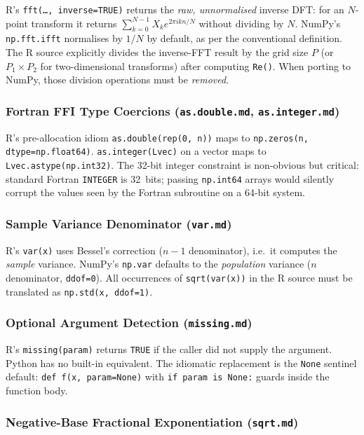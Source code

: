 \documentclass[12pt,a4paper]{article}
\begin{document}
R's \texttt{fft(\ldots,\,inverse=TRUE)} returns the \emph{raw, unnormalised} inverse DFT: for an $N$-point transform it returns $\sum_{k=0}^{N-1} X_k e^{2\pi i k n /N}$ without dividing by $N$. NumPy's \texttt{np.fft.ifft} normalises by $1/N$ by default, as per the conventional definition. The R source explicitly divides the inverse-FFT result by the grid size $P$ (or $P_1 \times P_2$ for two-dimensional transforms) after computing \texttt{Re()}. When porting to NumPy, those division operations must be \emph{removed}.

\subsubsection{Fortran FFI Type Coercions (\texttt{as.double.md}, \texttt{as.integer.md})}

R's pre-allocation idiom \texttt{as.double(rep(0, n))} maps to \texttt{np.zeros(n, dtype=np.float64)}. \texttt{as.integer(Lvec)} on a vector maps to \texttt{Lvec.astype(np.int32)}. The 32-bit integer constraint is non-obvious but critical: standard Fortran \texttt{INTEGER} is 32~bits; passing \texttt{np.int64} arrays would silently corrupt the values seen by the Fortran subroutine on a 64-bit system.

\subsubsection{Sample Variance Denominator (\texttt{var.md})}

R's \texttt{var(x)} uses Bessel's correction ($n-1$ denominator), i.e.\ it computes the \emph{sample} variance. NumPy's \texttt{np.var} defaults to the \emph{population} variance ($n$ denominator, \texttt{ddof=0}). All occurrences of \texttt{sqrt(var(x))} in the R source must be translated as \texttt{np.std(x, ddof=1)}.

\subsubsection{Optional Argument Detection (\texttt{missing.md})}

R's \texttt{missing(param)} returns \texttt{TRUE} if the caller did not supply the argument. Python has no built-in equivalent. The idiomatic replacement is the \texttt{None} sentinel default: \texttt{def f(x, param=None)} with \texttt{if param is None:} guards inside the function body.

\subsubsection{Negative-Base Fractional Exponentiation (\texttt{sqrt.md})}
\end{document}
